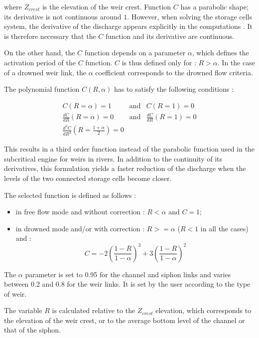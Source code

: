 where $Z_{crest}$ is the elevation of the weir crest. Function $C$ has a parabolic shape; its derivative is not continuous around $1$. However, when solving the storage cells system, the derivative of the discharge appears explicitly in the computations \cite{GOUTAL_RISSOAN02}. It is therefore necessary that the $C$ function and its derivative are continuous.

On the other hand, the $C$ function depends on a parameter $\alpha$, which defines the activation period of the $C$ function. $C$ is thus defined only for : $R > \alpha$. In the case of a drowned weir link, the $\alpha$ coefficient corresponds to the drowned flow criteria.

The polynomial function $C(R,\alpha)$ has to satisfy the following conditions :

\begin{eqnarray}
  C(R=\alpha)=1 & \mbox{and} & C(R=1)=0 \nonumber \\
  \frac{dC}{dR}(R=\alpha)=0 & \mbox{and} & \frac{dC}{dR}(R=1)=0 \nonumber \\
  \frac{d^2 C}{dR^2}(R=\frac{1+\alpha}{2})=0
\end{eqnarray}

This results in a third order function instead of the parabolic function used in the subcritical engine for weirs in rivers. In addition to the continuity of its derivatives, this formulation yields a faster reduction of the discharge when the levels of the two connected storage cells become closer.

The selected function is defined as follows :
\begin{itemize}
 \item in free flow mode and without correction : $R<\alpha$ and $C=1$;
 \item in drowned mode and/or with correction : $R>=\alpha$ ($R<1$ in all the cases) and :
   \begin{equation}
     C = -2 \left ( \frac{1-R}{1-\alpha} \right )^3 + 3 \left ( \frac{1-R}{1-\alpha} \right )^2
   \end{equation}
\end{itemize}

The $\alpha$ parameter is set to 0.95 for the channel and siphon links and varies between 0.2 and 0.8 for the weir links. It is set by the user according to the type of weir.

The variable $R$ is calculated relative to the $Z_{crest}$ elevation, which corresponds to the elevation of the weir crest, or to the average bottom level of the channel or that of the siphon.


